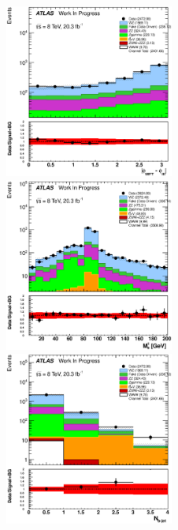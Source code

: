 \begin{figure}[htb]
\centering
\includegraphics[width=0.495\textwidth]{figures/appendix_signal_selection/Nov24Update_FakeSys_KFacSys_LogY_NoRebin/output/jobs/MxM/DataFull_Rates_May13_FakeRatesExactly2Loose_MuonMxMBJetGt0_ElBJetGt0SubtractPC_MxM/PreselectionNov23_15_physics/weight_all/eps/DeltaPhiMET123_Abs_histratio.eps}
\includegraphics[width=0.495\textwidth]{figures/appendix_signal_selection/Nov24Update_FakeSys_KFacSys_LogY_NoRebin/output/jobs/MxM/DataFull_Rates_May13_FakeRatesExactly2Loose_MuonMxMBJetGt0_ElBJetGt0SubtractPC_MxM/PreselectionNov23_15_physics/weight_all/eps/InvariantMassSFOS_histratio.eps}
\includegraphics[width=0.495\textwidth]{figures/appendix_signal_selection/Nov24Update_FakeSys_KFacSys_LogY_NoRebin/output/jobs/MxM/DataFull_Rates_May13_FakeRatesExactly2Loose_MuonMxMBJetGt0_ElBJetGt0SubtractPC_MxM/PreselectionNov23_15_physics/weight_all/eps/NBTaggedJets_histratio.eps}

\end{figure}
